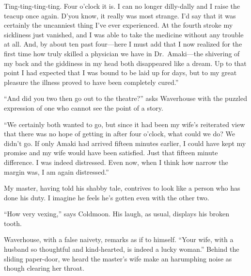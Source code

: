 \documentclass[12pt, openright]{book}
\begin{document}
Ting-ting-ting-ting. Four o'clock it is. I can no longer dilly-dally and
I raise the teacup once again. D'you know, it really was most strange.
I'd say that it was certainly the uncanniest thing I've ever
experienced. At the fourth stroke my sickliness just vanished, and I was
able to take the medicine without any trouble at all. And, by about ten
past four---here I must add that I now realized for the first time how
truly skilled a physician we have in Dr.~Amaki---the shivering of my
back and the giddiness in my head both disappeared like a dream. Up to
that point I had expected that I was bound to be laid up for days, but
to my great pleasure the illness proved to have been completely cured.''

``And did you two then go out to the theatre?'' asks Waverhouse with the
puzzled expression of one who cannot see the point of a story.

``We certainly both wanted to go, but since it had been my wife's
reiterated view that there was no hope of getting in after four o'clock,
what could we do? We didn't go. If only Amaki had arrived fifteen
minutes earlier, I could have kept my promise and my wife would have
been satisfied. Just that fifteen minute difference. I was indeed
distressed. Even now, when I think how narrow the margin was, I am again
distressed.''

My master, having told his shabby tale, contrives to look like a person
who has done his duty. I imagine he feels he's gotten even with the
other two.

``How very vexing,'' says Coldmoon. His laugh, as usual, displays his
broken tooth.

Waverhouse, with a false naivety, remarks as if to himself. ``Your wife,
with a husband so thoughtful and kind-hearted, is indeed a lucky
woman.'' Behind the sliding paper-door, we heard the master's wife make
an harumphing noise as though clearing her throat.
\end{document}
